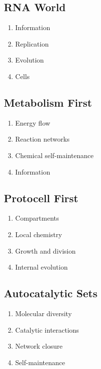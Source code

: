 \documentclass[
  oneside,
  openany]{book}
\providecommand{\tightlist}{%
  \setlength{\itemsep}{0pt}\setlength{\parskip}{0pt}}
\begin{document}
\subsection{RNA World}\label{rna-world-1}

\begin{enumerate}
\def\labelenumi{\arabic{enumi}.}
\tightlist
\item
  Information
\item
  Replication
\item
  Evolution
\item
  Cells
\end{enumerate}

\subsection{Metabolism First}\label{metabolism-first-1}

\begin{enumerate}
\def\labelenumi{\arabic{enumi}.}
\tightlist
\item
  Energy flow
\item
  Reaction networks
\item
  Chemical self-maintenance
\item
  Information
\end{enumerate}

\subsection{Protocell First}\label{protocell-first-1}

\begin{enumerate}
\def\labelenumi{\arabic{enumi}.}
\tightlist
\item
  Compartments
\item
  Local chemistry
\item
  Growth and division
\item
  Internal evolution
\end{enumerate}

\subsection{Autocatalytic Sets}\label{autocatalytic-sets}

\begin{enumerate}
\def\labelenumi{\arabic{enumi}.}
\tightlist
\item
  Molecular diversity
\item
  Catalytic interactions
\item
  Network closure
\item
  Self-maintenance
\end{enumerate}
\end{document}
